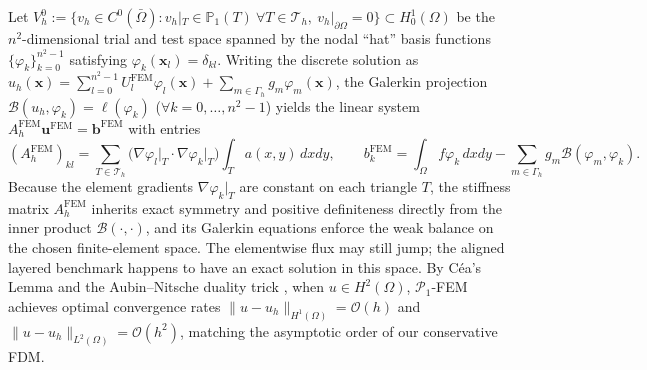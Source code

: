 \documentclass[11pt,a4paper]{article}
\theoremstyle{definition}
\theoremstyle{remark}
\begin{document}
Let $V_h^0 := \{ v_h \in C^0(\bar{\Omega}) : v_h|_T \in \mathbb{P}_1(T)\ \forall T \in \mathcal{T}_h,\ v_h|_{\partial\Omega} = 0 \} \subset H_0^1(\Omega)$ be the $n^2$-dimensional trial and test space spanned by the nodal ``hat'' basis functions $\{\varphi_k\}_{k=0}^{n^2-1}$ satisfying $\varphi_k(\bm{x}_l) = \delta_{kl}$. Writing the discrete solution as $u_h(\bm{x}) = \sum_{l=0}^{n^2-1} U_l^{\text{FEM}} \varphi_l(\bm{x}) + \sum_{m \in \Gamma_h} g_m \varphi_m(\bm{x})$, the Galerkin projection $\mathcal{B}(u_h, \varphi_k) = \ell(\varphi_k)$ ($\forall k = 0,\dots,n^2-1$) yields the linear system $A_h^{\text{FEM}} \bm{u}^{\text{FEM}} = \bm{b}^{\text{FEM}}$ with entries
\begin{equation}
    (A_h^{\text{FEM}})_{kl} = \sum_{T \in \mathcal{T}_h} \bigl(\nabla\varphi_l\big|_T \cdot \nabla\varphi_k\big|_T\bigr) \int_T a(x,y)\,dxdy, \qquad
    b_k^{\text{FEM}} = \int_\Omega f \varphi_k\,dxdy - \sum_{m \in \Gamma_h} g_m \mathcal{B}(\varphi_m, \varphi_k).
    \label{eq:fem_system}
\end{equation}
Because the element gradients $\nabla\varphi_k|_T$ are constant on each triangle $T$, the stiffness matrix $A_h^{\text{FEM}}$ inherits exact symmetry and positive definiteness directly from the inner product $\mathcal{B}(\cdot,\cdot)$, and its Galerkin equations enforce the weak balance on the chosen finite-element space. The elementwise flux may still jump; the aligned layered benchmark happens to have an exact solution in this space. By Céa's Lemma and the Aubin--Nitsche duality trick \cite{hiptmair2025}, when $u \in H^2(\Omega)$, $\mathcal{P}_1$-FEM achieves optimal convergence rates $\|u - u_h\|_{H^1(\Omega)} = \mathcal{O}(h)$ and $\|u - u_h\|_{L^2(\Omega)} = \mathcal{O}(h^2)$, matching the asymptotic order of our conservative FDM.
\end{document}
